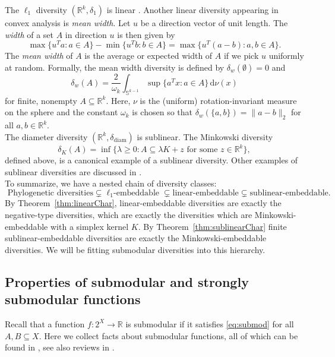 \documentclass{article}
\theoremstyle{plain}
\theoremstyle{definition}
\newcommand{\deltadiam}{\delta_{\mathrm{diam}}}
\renewcommand{\Re}{\mathbb{R}}
\begin{document}
The $\ell_1$ diversity $(\Re^k,\delta_1)$ is linear \cite{bryant2024linear}. Another linear diversity appearing in convex analysis is {\em mean width}. Let $u$ be a direction vector of unit length. The {\em width} of a set $A$ in direction $u$ is then given by 
\[\max\{u^Ta:a \in A\} - \min\{u^Tb: b \in A\} = \max\{u^T(a-b): a,b \in A\} .\]
The {\em mean width} of $A$ is the average or expected width of $A$ if we pick $u$ uniformly at random. Formally, the mean width diversity is defined by $\delta_w(\emptyset) = 0$ and
\[\delta_w(A) = 
\frac{2}{\omega_k} \int_{\mathbb{S}^{k-1}} \sup\{a^T x : a \in A \}  \, \mathrm{d} \nu(x) \]
for finite, nonempty $A \subseteq \Re^k$. Here, $\nu$ is the (uniform) rotation-invariant measure on the sphere and the constant %
$\omega_k$ is chosen so that $\delta_w(\{a,b\}) = \|a-b\|_2$ for all $a,b \in \Re^k$.\\

The diameter diversity $(\Re^k,\deltadiam)$ is sublinear. The Minkowski diversity 
\[\delta_K(A) = \inf\{\lambda \geq 0: A \subseteq \lambda K + z \mbox{ for some $z \in \Re^k$}\},\]
defined above, is a canonical example of a sublinear diversity. Other examples of sublinear diversities are discussed in \cite{bryant2024linear}. \\

To summarize, we have a nested chain of diversity classes:
\[\mbox{ Phylogenetic diversities}  \subsetneq \mbox{$\ell_1$-embeddable} \subsetneq \mbox{linear-embeddable}  \subsetneq \mbox{sublinear-embeddable.} \]
By Theorem~\ref{thm:linearChar}, linear-embeddable diversities are exactly the negative-type diversities, which are exactly the diversities which are Minkowski-embeddable with a simplex kernel $K$. By Theorem~\ref{thm:sublinearChar} finite sublinear-embeddable diversities are exactly the Minkowski-embeddable diversities. We will be fitting submodular diversities into this hierarchy.



\subsection{Properties of submodular and strongly submodular functions}


Recall that a function $f:2^X \rightarrow \Re$ is submodular if it satisfies \eqref{eq:submod} for  all $A,B \subseteq X$. Here we collect facts about submodular functions, all of which can be found in  \cite{lovasz-2023-submodular-setfunctions}, see also reviews in \cite{Frank2011,Fujishige2005,Lovasz1983,Schrijver2003}. 
\end{document}
